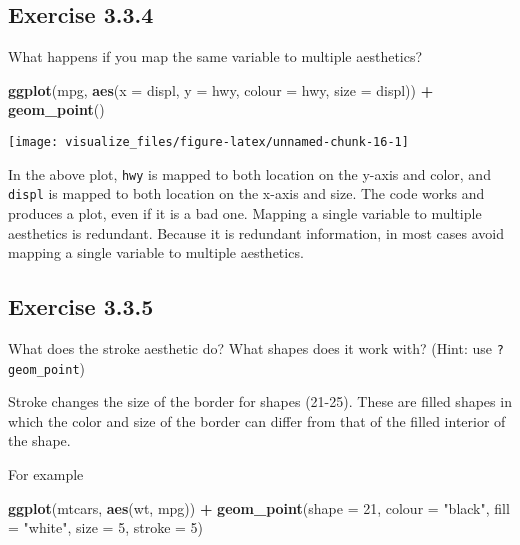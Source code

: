 \documentclass[]{book}
\newenvironment{Shaded}{\begin{snugshade}}{\end{snugshade}}
\newcommand{\DataTypeTok}[1]{\textcolor[rgb]{0.13,0.29,0.53}{#1}}
\newcommand{\DecValTok}[1]{\textcolor[rgb]{0.00,0.00,0.81}{#1}}
\newcommand{\KeywordTok}[1]{\textcolor[rgb]{0.13,0.29,0.53}{\textbf{#1}}}
\newcommand{\NormalTok}[1]{#1}
\newcommand{\OperatorTok}[1]{\textcolor[rgb]{0.81,0.36,0.00}{\textbf{#1}}}
\newcommand{\StringTok}[1]{\textcolor[rgb]{0.31,0.60,0.02}{#1}}
\theoremstyle{plain}
\theoremstyle{remark}
\theoremstyle{definition}
\theoremstyle{definition}
\theoremstyle{definition}
\theoremstyle{remark}
\begin{document}
\hypertarget{exercise-3.3.4}{%
\subsection*{\texorpdfstring{Exercise
{3.3.4}}{Exercise 3.3.4}}\label{exercise-3.3.4}}

What happens if you map the same variable to multiple aesthetics?

\begin{Shaded}
\begin{Highlighting}[]
\KeywordTok{ggplot}\NormalTok{(mpg, }\KeywordTok{aes}\NormalTok{(}\DataTypeTok{x =}\NormalTok{ displ, }\DataTypeTok{y =}\NormalTok{ hwy, }\DataTypeTok{colour =}\NormalTok{ hwy, }\DataTypeTok{size =}\NormalTok{ displ)) }\OperatorTok{+}
\StringTok{  }\KeywordTok{geom_point}\NormalTok{()}
\end{Highlighting}
\end{Shaded}

\begin{center}\texttt{[image: visualize\_files/figure-latex/unnamed-chunk-16-1]} \end{center}

In the above plot, \texttt{hwy} is mapped to both location on the y-axis
and color, and \texttt{displ} is mapped to both location on the x-axis
and size. The code works and produces a plot, even if it is a bad one.
Mapping a single variable to multiple aesthetics is redundant. Because
it is redundant information, in most cases avoid mapping a single
variable to multiple aesthetics.

\hypertarget{exercise-3.3.5}{%
\subsection*{\texorpdfstring{Exercise
{3.3.5}}{Exercise 3.3.5}}\label{exercise-3.3.5}}

What does the stroke aesthetic do? What shapes does it work with? (Hint:
use \texttt{?geom\_point})

Stroke changes the size of the border for shapes (21-25). These are
filled shapes in which the color and size of the border can differ from
that of the filled interior of the shape.

For example

\begin{Shaded}
\begin{Highlighting}[]
\KeywordTok{ggplot}\NormalTok{(mtcars, }\KeywordTok{aes}\NormalTok{(wt, mpg)) }\OperatorTok{+}
\StringTok{  }\KeywordTok{geom_point}\NormalTok{(}\DataTypeTok{shape =} \DecValTok{21}\NormalTok{, }\DataTypeTok{colour =} \StringTok{"black"}\NormalTok{, }\DataTypeTok{fill =} \StringTok{"white"}\NormalTok{, }\DataTypeTok{size =} \DecValTok{5}\NormalTok{, }\DataTypeTok{stroke =} \DecValTok{5}\NormalTok{)}
\end{Highlighting}
\end{Shaded}
\end{document}

